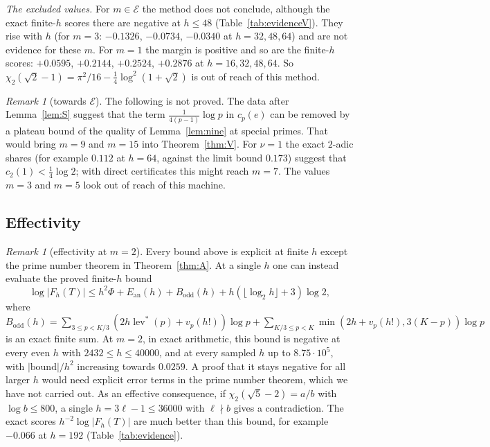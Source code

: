 \documentclass[11pt]{amsart}
\theoremstyle{definition}
\theoremstyle{remark}
\newtheorem{remark}[theorem]{Remark}
\numberwithin{equation}{section}
\newcommand{\cE}{\mathcal{E}}
\newcommand{\lev}{\operatorname{lev}^{*}}
\begin{document}
\emph{The excluded values.} For $m\in\cE$ the method does not conclude, although the exact finite-$h$ scores there are
negative at $h\le48$ (Table~\ref{tab:evidenceV}). They rise with $h$ (for $m=3$: $-0.1326$, $-0.0734$, $-0.0340$ at
$h=32,48,64$) and are not evidence for these $m$. For $m=1$ the margin is positive and so are the finite-$h$ scores:
$+0.0595$, $+0.2144$, $+0.2524$, $+0.2876$ at $h=16,32,48,64$. So $\chi_2(\sqrt2-1)=\pi^2/16-\frac14\log^2(1+\sqrt2)$ is out
of reach of this method.

\begin{remark}[towards $\cE$]\label{rem:closeE}
The following is not proved. The data after Lemma~\ref{lem:S} suggest that the term $\frac1{4(p-1)}\log p$ in $c_p(e)$
can be removed by a plateau bound of the quality of Lemma~\ref{lem:nine} at special primes. That would bring $m=9$ and
$m=15$ into Theorem~\ref{thm:V}. For $\nu=1$ the exact $2$-adic shares (for example $0.112$ at $h=64$, against the
limit bound $0.173$) suggest that $c_2(1)<\frac14\log2$; with direct certificates this might reach $m=7$. The values
$m=3$ and $m=5$ look out of reach of this machine.
\end{remark}

\subsection{Effectivity}

\begin{remark}[effectivity at $m=2$]\label{rem:effective}
Every bound above is explicit at finite $h$ except the prime number theorem in Theorem~\ref{thm:A}. At a single $h$ one
can instead evaluate the proved finite-$h$ bound
\[
  \log|F_h(T)|\le h^2\Phi+E_{\mathrm{an}}(h)+B_{\mathrm{odd}}(h)+h(\lfloor\log_2h\rfloor+3)\log2,
\]
where $B_{\mathrm{odd}}(h)=\sum_{3\le p<K/3}(2h\lev(p)+v_p(h!))\log p+\sum_{K/3\le p<K}\min(2h+v_p(h!),3(K-p))\log p$ is an
exact finite sum. At $m=2$, in exact arithmetic, this bound is negative at every even $h$ with $2432\le h\le40000$, and at
every sampled $h$ up to $8.75\cdot10^5$, with $|\text{bound}|/h^2$ increasing towards $0.0259$. A proof that it stays
negative for all larger $h$ would need explicit error terms in the prime number theorem, which we have not carried out.
As an effective consequence, if $\chi_2(\sqrt5-2)=a/b$ with $\log b\le800$, a single $h=3\ell-1\le36000$ with $\ell\nmid b$
gives a contradiction. The exact scores $h^{-2}\log|F_h(T)|$ are much better than this bound, for example $-0.066$ at
$h=192$ (Table~\ref{tab:evidence}).
\end{remark}
\end{document}
